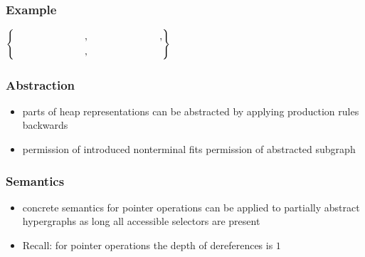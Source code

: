 \documentclass{beamer}
\begin{document}
\begin{frame}
	\frametitle{Example}
	$\left\{\begin{aligned}
			 & \parbox{2.5cm}{\resizebox{2.5cm}{!}{
					
				}}, \parbox{2.5cm}{\resizebox{2.5cm}{!}{
					
				}},\\& \parbox{2.5cm}{\resizebox{2.5cm}{!}{
					
				}}, \parbox{2.5cm}{\resizebox{2.5cm}{!}{
					
		}}
		\end{aligned} \right\}$
	\flushright\scalebox{0.4}{}
\end{frame}

\begin{frame}
	\frametitle{Abstraction}
	\begin{itemize}
		\item parts of heap representations can be abstracted by applying
			production rules backwards
		\item permission of introduced nonterminal fits permission of abstracted
			subgraph
	\end{itemize}
	\resizebox{\textwidth}{!}{}
\end{frame}

\begin{frame}
	\frametitle{Semantics}
	\begin{itemize}
		\item concrete semantics for pointer operations can be applied to
			partially abstract hypergraphs as long all accessible selectors
			are present
		\item Recall: for pointer operations the depth of dereferences is $1$
	\end{itemize}
	\begin{columns}
			\begin{overlayarea}{\textwidth}{\textheight}
				\scalebox{0.8}{\resizebox{\textwidth}{!}{}}
			\end{overlayarea}
			\begin{overlayarea}{\textwidth}{\textheight}
				\only<2>{\scalebox{0.9}{\resizebox{\textwidth}{!}{}}}
				\only<3>{\scalebox{0.9}{\resizebox{\textwidth}{!}{}}}
				\only<4>{\scalebox{0.9}{\resizebox{\textwidth}{!}{}}}
				\only<5>{\scalebox{0.9}{\resizebox{\textwidth}{!}{}}}
			\end{overlayarea}
	\end{columns}
\end{frame}
\end{document}
